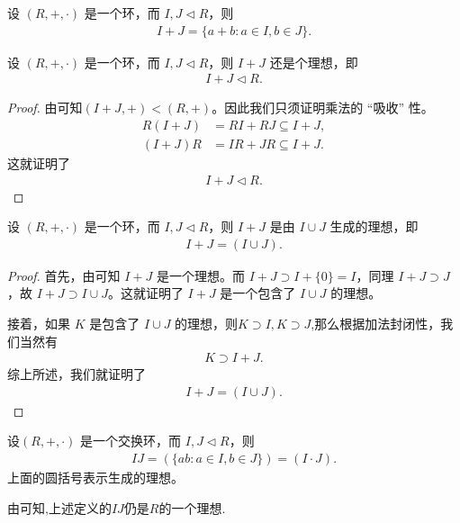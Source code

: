 \documentclass[../../main.tex]{subfiles}
\begin{document}
\begin{definition}[理想的加法]
设 $(R, +, \cdot)$ 是一个环，而 $I, J \lhd R$，则
\begin{align*}
I + J = \{a + b : a \in I, b \in J\}.
\end{align*}
\end{definition}

\begin{proposition}[理想的加法还是理想]\label{proposition:理想的加法还是理想}
设 $(R, +, \cdot)$ 是一个环，而 $I, J \lhd R$，则 $I + J$ 还是个理想，即
\begin{align*}
I + J \lhd R.
\end{align*}
\end{proposition}
\begin{proof}
由可知$(I+J,+)<(R,+)$。因此我们只须证明乘法的 “吸收” 性。
\begin{align*}
R(I + J) &= RI + RJ \subseteq I + J,\\
(I + J)R &= IR + JR \subseteq I + J.
\end{align*}
这就证明了
\begin{align*}
I + J \lhd R.
\end{align*} 
\end{proof}

\begin{proposition}
设 $(R, +, \cdot)$ 是一个环，而 $I, J \lhd R$，则 $I + J$ 是由 $I \cup J$ 生成的理想，即
\begin{align*}
I + J = (I \cup J) .
\end{align*}
\end{proposition}
\begin{proof}
首先，由可知 $I + J$ 是一个理想。而 $I + J \supset I + \{0\} = I$，同理 $I + J \supset J$，故 $I + J \supset I \cup J$。这就证明了 $I + J$ 是一个包含了 $I \cup J$ 的理想。

接着，如果 $K$ 是包含了 $I \cup J$ 的理想，则$K\supset I,K\supset J$,那么根据加法封闭性，我们当然有
\begin{align*}
K \supset I + J.
\end{align*}
综上所述，我们就证明了
\begin{align*}
I + J = (I \cup J).
\end{align*} 
\end{proof}

\begin{definition}[理想的乘法]
设$(R, +, \cdot)$ 是一个交换环，而 $I, J \lhd R$，则
\begin{align*}
IJ = (\{ab : a \in I, b \in J\})=(I\cdot J).
\end{align*}
上面的圆括号表示生成的理想。
\end{definition}
\begin{remark}
由可知,上述定义的$IJ$仍是$R$的一个理想.
\end{remark}
\end{document}
